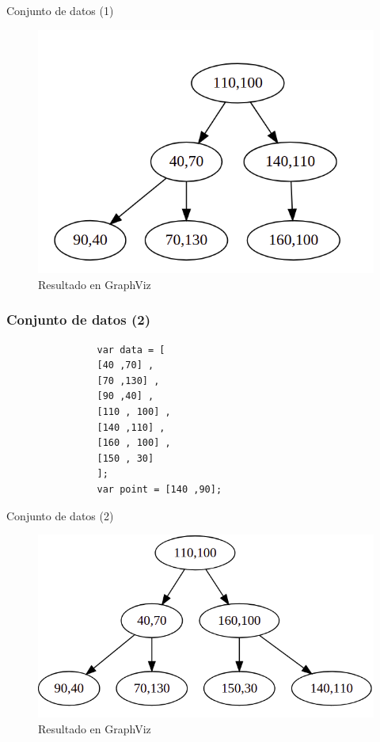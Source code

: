 \documentclass[11pt]{beamer}
\begin{document}
		\begin{frame}{Conjunto de datos (1)}
			\justifying
		    
		    \begin{figure}[H]
				\centering
				\includegraphics[scale=0.40]{img/query1.png}
				\caption{Resultado en GraphViz}
				\label{fig:graphviz1}
			\end{figure}
			
		\end{frame}
		
		\begin{frame}[fragile]\frametitle{Conjunto de datos (2)}
			\justifying
			\begin{verbatim}
		        var data = [
                [40 ,70] ,
                [70 ,130] ,
                [90 ,40] ,
                [110 , 100] ,
                [140 ,110] ,
                [160 , 100] ,
                [150 , 30]
                ];
                var point = [140 ,90]; 
		    \end{verbatim}  
		    
			
		\end{frame}
		
		\begin{frame}{Conjunto de datos (2)}
			\justifying
		    
		    \begin{figure}[H]
				\centering
				\includegraphics[scale=0.40]{img/query3.png}
				\caption{Resultado en GraphViz}
				\label{fig:graphviz2}
			\end{figure}
			
		\end{frame}
		
\end{document}
